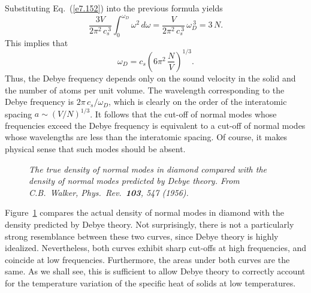 Substituting Eq.~(\ref{e7.152}) into the previous formula yields
\begin{equation}
\frac{3 V}{2\pi^2 \,c_s^{~3}}\int_0^{\omega_D} \omega^2\, d\omega = \frac{V}
{2\pi^2\, c_s^{~3}}\,\omega_D^{~3} = 3\,N.
\end{equation}
This implies that
\begin{equation}
\omega_D = c_s\left(6 \pi^2 \,\frac{N}{V}\right)^{1/3}.\label{e7.156}
\end{equation}
Thus, the Debye frequency  depends only on the sound velocity in the solid and the number
of atoms per unit volume. The wavelength corresponding to the Debye frequency
is $2\pi\,c_s/\omega_D$, which is clearly on the order of the interatomic spacing
$a\sim (V/N)^{1/3}$. 
It follows that the cut-off of normal modes whose frequencies  exceed the Debye frequency
is equivalent to a cut-off of normal modes whose wavelengths are less than the interatomic
spacing. Of course, it makes physical sense that such modes should be absent. 

\begin{figure}[ht]
\epsfysize=3.5in
\centerline{}
\caption{\em The true density of normal modes in  diamond compared with
the density of normal modes predicted by Debye theory. From C.B.~Walker, Phys.\ Rev.\ {\bf 103}, 547 (1956).}\label{fdia}
\end{figure}

Figure~\ref{fdia} compares  the actual density of normal modes in diamond with
the density predicted by Debye theory. 
Not surprisingly, there is not a particularly strong resemblance
between these two curves, since Debye theory is highly idealized. 
Nevertheless, both curves exhibit sharp cut-offs at high frequencies, and
coincide at low frequencies. Furthermore, the areas under both curves are
the same. As we shall see,
 this is sufficient to allow Debye theory to correctly account for
the temperature variation of the specific heat of solids  at low temperatures. 


